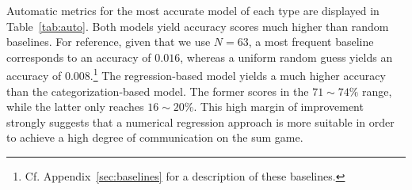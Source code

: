 \documentclass[twocolumn]{article}
\begin{document}
\begin{table}%
    \centering

    \caption{\label{tab:auto} Performances of best models}
\end{table}

Automatic metrics for the most accurate model of each type are displayed in Table~\ref{tab:auto}.
Both models yield accuracy scores much higher than random baselines.
For reference, given that we use $N=63$, a most frequent baseline corresponds to an accuracy of $0.016$, whereas a uniform random guess yields an accuracy of $0.008$.\footnote{
    Cf. Appendix~\ref{sec:baselines} for a description of these baselines.
}
The regression-based model yields a much higher accuracy than the categorization-based model.
The former scores in the $71\sim74\%$ range, while the latter only reaches $16\sim20\%$.
This high margin of improvement strongly suggests that a numerical regression approach is more suitable in order to achieve a high degree of communication on the sum game.
\end{document}
